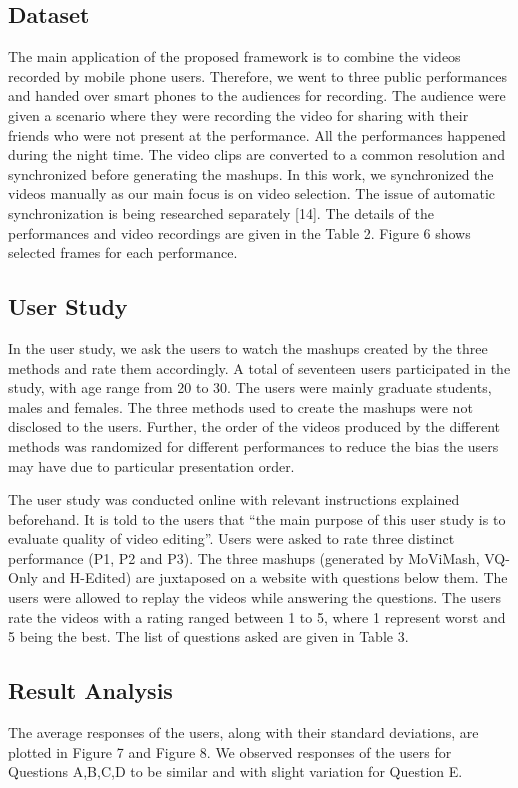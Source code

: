 \documentclass{sig-alternate-05-2015}
\begin{document}
\subsection{Dataset}
The main application of the proposed framework is to combine
the videos recorded by mobile phone users. Therefore, we went to
three public performances and handed over smart phones to the audiences for recording. The audience were given a scenario where
they were recording the video for sharing with their friends who
were not present at the performance. All the performances happened during the night time. The video clips are converted to a
common resolution and synchronized before generating the mashups.
In this work, we synchronized the videos manually as our main focus is on video selection. The issue of automatic synchronization is
being researched separately [14]. The details of the performances
and video recordings are given in the Table 2. Figure 6 shows selected frames for each performance.
\subsection{User Study}
In the user study, we ask the users to watch the mashups created
by the three methods and rate them accordingly. A total of seventeen users participated in the study, with age range from 20 to 30.
The users were mainly graduate students, males and females. The
three methods used to create the mashups were not disclosed to the
users. Further, the order of the videos produced by the different
methods was randomized for different performances to reduce the
bias the users may have due to particular presentation order.\par
The user study was conducted online with relevant instructions
explained beforehand. It is told to the users that “the main purpose
of this user study is to evaluate quality of video editing”. Users
were asked to rate three distinct performance (P1, P2 and P3). The
three mashups (generated by MoViMash, VQ-Only and H-Edited)
are juxtaposed on a website with questions below them. The users were allowed to replay the videos while answering the questions.
The users rate the videos with a rating ranged between 1 to 5, where
1 represent worst and 5 being the best. The list of questions asked
are given in Table 3.
\subsection{Result Analysis}
The average responses of the users, along with their standard
deviations, are plotted in Figure 7 and Figure 8. We observed responses of the users for Questions A,B,C,D to be similar and with
slight variation for Question E.
\end{document}
